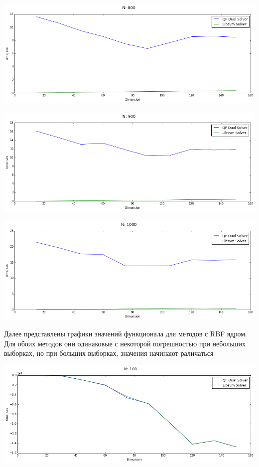 \documentclass[12pt, a4paper]{article}
\begin{document}
			\begin{center}
				\includegraphics[width=18cm]{2par_N800_one.png}
			\end{center}

			\begin{center}
				\includegraphics[width=18cm]{2par_N900_one.png}
			\end{center}

			\begin{center}
				\includegraphics[width=18cm]{2par_N1000_one.png}
			\end{center}

			Далее представлены графики значений функционала для методов с RBF ядром. Для обоих методов они одинаковые с некоторой погрешностью при небольших выборках, но при больших выборках, значения начинают раличаться

			\begin{center}
				\includegraphics[width=18cm]{2par_obj_N100_one.png}
			\end{center}
\end{document}
